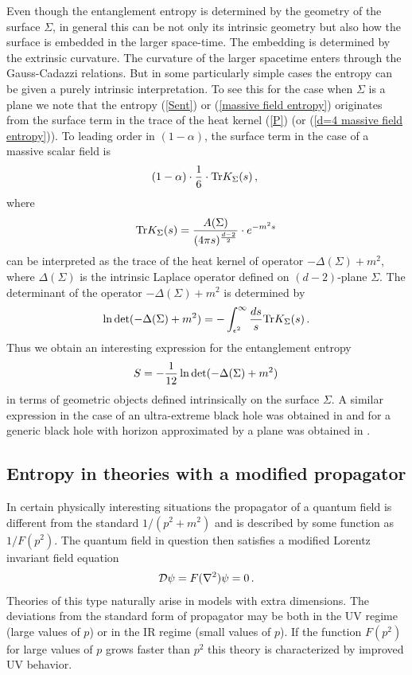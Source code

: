 \documentclass[12pt]{article}
\def\Tr{\hbox{Tr}}
\def\be{\begin{eqnarray}}
\def\ee{\end{eqnarray}}
\def\lb{\label}
\def\o{\over}
\begin{document}
Even though the entanglement entropy is determined by the geometry of the surface $\Sigma$, in general this can be not only its intrinsic geometry but also
how the surface is embedded in the larger space-time. The embedding is determined by the extrinsic curvature. 
The curvature of the larger spacetime enters through the Gauss-Cadazzi relations.
But in some particularly simple cases the entropy can be given a purely intrinsic interpretation. To see this for the case when $\Sigma$ is a plane we note that the
entropy (\ref{Sent}) or  (\ref{massive field entropy}) originates from the surface term in the trace of the  heat kernel (\ref{P}) (or (\ref{d=4 massive field entropy})). To leading order in $(1-\alpha)$, the surface term in the case of a massive scalar field is
$$
(1-\alpha) \cdot {1\o 6} \cdot \Tr K_\Sigma (s)\, ,\,\, 
$$
where 
$$
\Tr K_\Sigma(s)=\frac{A(\Sigma)}{(4\pi s)^{{d-2}\over 2}}\cdot e^{-m^2 s}\,
$$
can be interpreted as  the trace of the heat kernel of operator $-\Delta(\Sigma)+m^2$, where $\Delta(\Sigma)$ is the intrinsic Laplace operator  defined on $(d-2)$-plane $\Sigma$.
The determinant of the operator $-\Delta(\Sigma)+m^2$ is determined by 
$$
\ln\det(-\Delta(\Sigma)+m^2)=-\int_{\epsilon^2}^\infty {ds\o s}\Tr K_\Sigma (s)\, .
$$ 
Thus we obtain an interesting expression for the entanglement entropy 
\be
S=-{1\o 12}\ln\det(-\Delta(\Sigma)+m^2)\,
\lb{Sdeterminant}
\ee
in terms of geometric objects defined intrinsically on the  surface $\Sigma$. A similar expression in the case of an ultra-extreme black hole was
obtained in \cite{Mann:1997hm} and for a generic black hole with horizon approximated by a plane was obtained in \cite{Frolov:1998ea}.







\subsection{Entropy in theories with a modified propagator}
\label{section: theories with a modified propagator}
In certain physically interesting situations the propagator of a quantum field is different from the standard $1/(p^2+m^2)$ and is described by some 
function  as $1/F(p^2)$.  The quantum field in question then satisfies a modified Lorentz invariant field equation 
\be
{\cal D}\psi= F(\nabla^2)\psi=0\, .
\lb{F-operator}
\ee
Theories of this type naturally arise in models with extra dimensions. The deviations from the standard form of propagator may be
both in the UV regime (large values of $p$) or in the IR regime (small values of $p$). If the function $F(p^2)$ for large values of $p$ grows 
faster than $p^2$ this theory is characterized by improved UV behavior.
\end{document}
